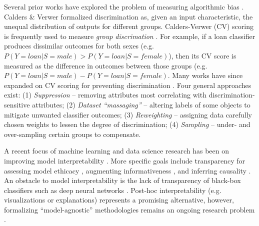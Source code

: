 \documentclass[sigconf]{acmart}
\begin{document}
Several prior works have explored the problem of measuring algorithmic bias \cite{romei2014multidisciplinary, kamiran2013quantifying, zliobaite2015survey}.
Calders \& Verwer \cite{Calders2010} formalized discrimination as, given an input characteristic, the unequal distribution of outputs for different groups. 
Calders-Verwer (CV) scoring is frequently \cite{kamishima2011fairness, kamishima2012fairness, galhotra2017fairness, calders2009building, kamiran2009classifying, kamiran2010discrimination, kamiran2012decision, vzliobaite2011handling} used to measure \emph{group discrimation} \cite{zafar2015learning, zemel2013learning}. For example, if a loan classifier produces dissimilar outcomes for both sexes (e.g. $P(Y=loan|S=male) > P(Y=loan|S=female)$), then its CV score is measured as the difference in outcomes between those groups (e.g. $P(Y=loan|S=male) - P(Y=loan|S=female)$.
Many works have since expanded on CV scoring for preventing discrimination \cite{hajian2011discrimination, vzliobaite2011handling, zafar2017fairness, kamiran2010discrimination, kamiran2013techniques, galhotra2017fairness}. 
Four general approaches exist: (1) \emph{Suppression} -- removing attributes most correlating with discrimination-sensitive attributes; (2) \emph{Dataset ``massaging''} -- altering labels of some objects to mitigate unwanted classifier outcomes; (3) \emph{Reweighting} -- assigning data carefully chosen weights to lessen the degree of discrimination; (4) \emph{Sampling} -- under- and over-sampling certain groups to compensate.

A recent focus of machine learning and data science research has been on improving model interpretability \cite{lipton2016mythos, juang2013data, zhou2008low}.
More specific goals include transparency for assessing model ethicacy \cite{goodman2017european, herman2017data}, augmenting informativeness \cite{kim2015interactive, yang2018visually, wu2017interpretable}, and inferring causality \cite{wang1999smoking, briand1993developing, syed2009enzyme}. 
An obstacle to model interpretability is the lack of transparency of black-box classifiers such as deep neural networks \cite{casillas2013interpretability, cortez2013using, krause2016interacting}.  Post-hoc interpretability \cite{lipton2016mythos} (e.g. visualizations or explanations) represents a promising alternative, however, formalizing  ``model-agnostic'' methodologies remains an ongoing research problem \cite{ribeiro2016should}.

\end{document}
